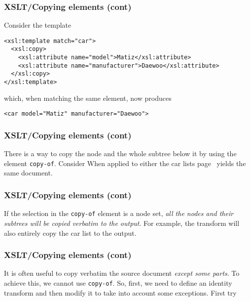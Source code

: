 %
\begin{frame}[containsverbatim]
\frametitle{XSLT/Copying elements (cont)}

Consider the template
{\small
\begin{verbatim}
<xsl:template match="car">
  <xsl:copy>
    <xsl:attribute name="model">Matiz</xsl:attribute>
    <xsl:attribute name="manufacturer">Daewoo</xsl:attribute>
  </xsl:copy>
</xsl:template>
\end{verbatim}
}
which, when matching the same element, now produces
{\small
\begin{verbatim}
<car model="Matiz" manufacturer="Daewoo">
\end{verbatim}
}

\end{frame}

%
\begin{frame} 
\frametitle{XSLT/Copying elements (cont)}

There is a way to copy the node and the whole subtree below it by using
the \XSLT element \texttt{copy-of}. Consider
When applied to either the car lists page~\pageref{cars} yields the
same document.

\end{frame}

%
\begin{frame} 
\frametitle{XSLT/Copying elements (cont)}

If the selection in the \texttt{copy-of} element is a node set,
\emph{all the nodes and their subtrees will be copied verbatim to the
  output}. For example, the transform
will also entirely copy the car list to the output.

\end{frame}

%
\begin{frame} 
\frametitle{XSLT/Copying elements (cont)}

It is often useful to copy verbatim the source document \emph{except
some parts}. To achieve this, we cannot use \texttt{copy-of}. So,
first, we need to define an identity transform and then modify it to
take into account some exceptions. First try

\end{frame}

